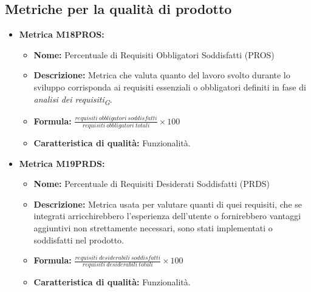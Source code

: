 \subsection{Metriche per la qualità di prodotto}
\begin{itemize}
    
    \item \hypertarget{item:M18PROS}{\textbf{Metrica M18PROS:}}
    \begin{minipage}[t]{0.9\textwidth}
        \begin{itemize}
            \item \textbf{Nome:} Percentuale di Requisiti Obbligatori Soddisfatti (PROS)
            \item \textbf{Descrizione:} Metrica che valuta quanto del lavoro svolto durante lo sviluppo corrisponda ai requisiti essenziali o obbligatori definiti in fase di \textit{analisi dei requisiti}\textsubscript{\textit{G}}.
            \item \textbf{Formula:} $\frac{requisiti \ obbligatori \ soddisfatti}{requisiti \ obbligatori \ totali}\times 100$
            \item \textbf{Caratteristica di qualità:} Funzionalità.
        \end{itemize}
    \end{minipage}

    \item \hypertarget{item:M19PRDS}{\textbf{Metrica M19PRDS:}}
    \begin{minipage}[t]{0.9\textwidth}
        \begin{itemize}
            \item \textbf{Nome:} Percentuale di Requisiti Desiderati Soddisfatti (PRDS)
            \item \textbf{Descrizione:} Metrica usata per valutare quanti di quei requisiti, che se integrati arricchirebbero l'esperienza dell'utente o fornirebbero vantaggi aggiuntivi non strettamente necessari, sono stati implementati o soddisfatti nel prodotto.
            \item \textbf{Formula:} $\frac{requisiti \ desiderabili \ soddisfatti}{requisiti \ desiderabili \ totali}\times 100$
            \item \textbf{Caratteristica di qualità:} Funzionalità.
        \end{itemize}
    \end{minipage}


\end{itemize}
